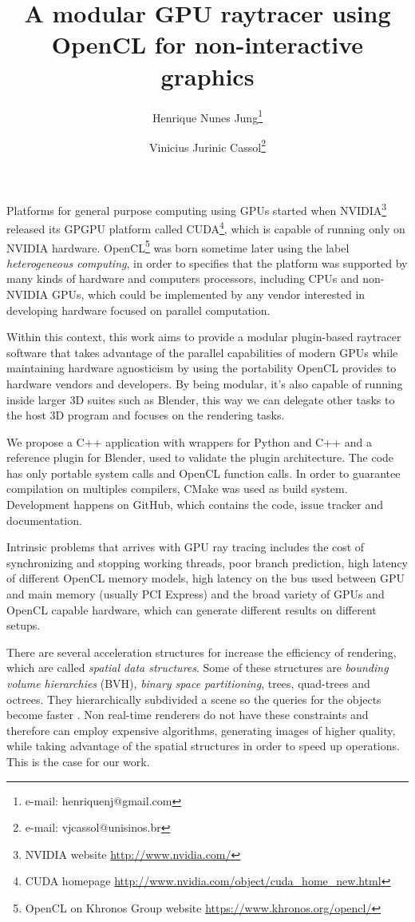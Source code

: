 \documentclass{vgtc}
\title{A modular GPU raytracer using OpenCL for non-interactive graphics}
\author{Henrique Nunes Jung\thanks{e-mail: henriquenj@gmail.com}
\and Vinicius Jurinic Cassol\thanks{e-mail: vjcassol@unisinos.br}}
\affiliation{\scriptsize Universidade do Vale do Rio dos Sinos}
\begin{document}

\maketitle

Platforms for general purpose computing using GPUs started when
NVIDIA\footnote{NVIDIA website \url{http://www.nvidia.com/}} released
its GPGPU platform called CUDA\footnote{CUDA homepage
 \url{http://www.nvidia.com/object/cuda_home_new.html}}, which is
capable of running only on NVIDIA hardware. OpenCL\footnote{OpenCL on
 Khronos Group website \url{https://www.khronos.org/opencl/}} was
born sometime later using the label \emph{heterogeneous computing}, in
order to specifies that the platform was supported by many kinds of
hardware and computers processors, including CPUs and non-NVIDIA GPUs,
which could be implemented by any vendor interested in developing
hardware focused on parallel computation.

Within this context, this work aims to provide a modular plugin-based
raytracer software that takes advantage of the parallel capabilities
of modern GPUs while maintaining hardware agnosticism by using the
portability OpenCL provides to hardware vendors and developers. By
being modular, it's also capable of running inside larger 3D suites
such as Blender, this way we can delegate other tasks to the host 3D
program and focuses on the rendering tasks.

We propose a C++ application with wrappers for
Python %
and C++ and a reference plugin for Blender, used to validate the
plugin architecture. The code has only portable system calls and
OpenCL function calls. In order to guarantee compilation on multiples
compilers, CMake was used as build system. Development happens on
GitHub, which contains the code, issue tracker and
documentation.

Intrinsic problems that arrives with GPU ray tracing includes the cost
of synchronizing and stopping working threads, poor branch prediction,
high latency of different OpenCL memory models, high latency on the
bus used between GPU and main memory (usually PCI Express) and the
broad variety of GPUs and OpenCL capable hardware, which can generate
different results on different setups.

There are several acceleration structures for increase the efficiency
of rendering, which are called \emph{spatial data structures}. Some of
these structures are \emph{bounding volume hierarchies} (BVH),
\emph{binary space partitioning}, trees, quad-trees and octrees. They
hierarchically subdivided a scene so the queries for the objects become
faster \cite[Chapter~14.1]{akenine-moller:2008}. Non real-time renderers
do not have these constraints and therefore can employ expensive
algorithms, generating images of higher quality, while taking
advantage of the spatial structures in order to speed up
operations. This is the case for our work.
\end{document}
